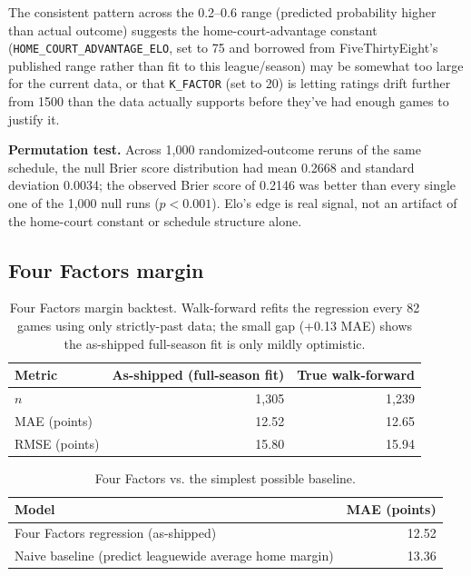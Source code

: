 \documentclass[11pt]{article}
\newcommand{\code}[1]{\allowbreak\texttt{\small #1}\allowbreak}
\begin{document}
The consistent pattern across the 0.2--0.6 range (predicted probability higher than actual outcome) suggests
the home-court-advantage constant (\code{HOME\_COURT\_ADVANTAGE\_ELO}, set to 75 and borrowed from
FiveThirtyEight's published range rather than fit to this league/season) may be somewhat too large for the
current data, or that \code{K\_FACTOR} (set to 20) is letting ratings drift further from 1500 than the data
actually supports before they've had enough games to justify it.

\textbf{Permutation test.} Across 1,000 randomized-outcome reruns of the same schedule, the null Brier score
distribution had mean 0.2668 and standard deviation 0.0034; the observed Brier score of 0.2146 was better
than every single one of the 1,000 null runs ($p < 0.001$). Elo's edge is real signal, not an artifact of the
home-court constant or schedule structure alone.

\subsection{Four Factors margin}
\label{sec:four-factors}

\begin{table}[h]
\centering
\begin{tabular}{lrr}
\toprule
Metric & As-shipped (full-season fit) & True walk-forward \\
\midrule
$n$ & 1,305 & 1,239 \\
MAE (points) & 12.52 & 12.65 \\
RMSE (points) & 15.80 & 15.94 \\
\bottomrule
\end{tabular}
\caption{Four Factors margin backtest. Walk-forward refits the regression every 82 games using only
strictly-past data; the small gap (+0.13 MAE) shows the as-shipped full-season fit is only mildly optimistic.}
\end{table}

\begin{table}[h]
\centering
\begin{tabular}{lr}
\toprule
Model & MAE (points) \\
\midrule
Four Factors regression (as-shipped) & 12.52 \\
Naive baseline (predict leaguewide average home margin) & 13.36 \\
\bottomrule
\end{tabular}
\caption{Four Factors vs. the simplest possible baseline.}
\end{table}
\end{document}

